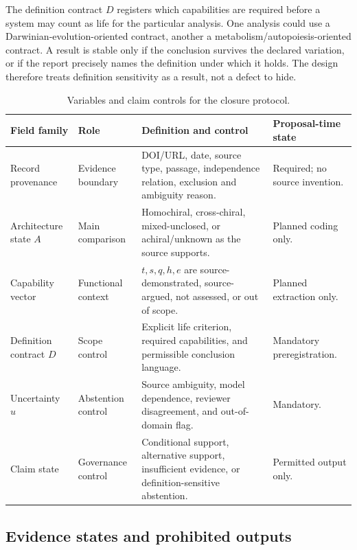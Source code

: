 \documentclass[conference]{IEEEtran}
\begin{document}
The definition contract $D$ registers which capabilities are required before a system may count as life for the particular analysis. One analysis could use a Darwinian-evolution-oriented contract, another a metabolism/autopoiesis-oriented contract. A result is stable only if the conclusion survives the declared variation, or if the report precisely names the definition under which it holds. The design therefore treats definition sensitivity as a result, not a defect to hide.

\begin{table}[!t]
\caption{Variables and claim controls for the closure protocol.}
\label{tab:variables}
\centering
\renewcommand{\arraystretch}{1.18}
\begin{tabular}{|P{0.18\textwidth}|P{0.17\textwidth}|P{0.31\textwidth}|P{0.15\textwidth}|}
\hline
\textbf{Field family} & \textbf{Role} & \textbf{Definition and control} & \textbf{Proposal-time state} \\
\hline
Record provenance & Evidence boundary & DOI/URL, date, source type, passage, independence relation, exclusion and ambiguity reason. & Required; no source invention. \\
\hline
Architecture state $A$ & Main comparison & Homochiral, cross-chiral, mixed-unclosed, or achiral/unknown as the source supports. & Planned coding only. \\
\hline
Capability vector & Functional context & $t,s,q,h,e$ are source-demonstrated, source-argued, not assessed, or out of scope. & Planned extraction only. \\
\hline
Definition contract $D$ & Scope control & Explicit life criterion, required capabilities, and permissible conclusion language. & Mandatory preregistration. \\
\hline
Uncertainty $u$ & Abstention control & Source ambiguity, model dependence, reviewer disagreement, and out-of-domain flag. & Mandatory. \\
\hline
Claim state & Governance control & Conditional support, alternative support, insufficient evidence, or definition-sensitive abstention. & Permitted output only. \\
\hline
\end{tabular}
\end{table}

\subsection{Evidence states and prohibited outputs}
\end{document}

